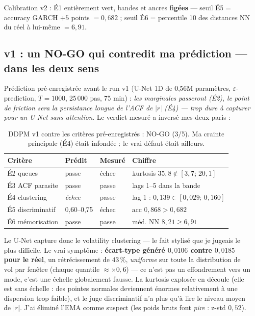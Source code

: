 \documentclass[11pt,a4paper]{article}
\newcommand{\ok}[1]{\textcolor{okgreen}{#1}}
\newcommand{\ko}[1]{\textcolor{kored}{#1}}
\begin{document}
Calibration v2 : É1 entièrement vert, bandes et ancres \textbf{figées} --- seuil É5 =
accuracy GARCH $+5$ points $= 0{,}682$ ; seuil É6 = percentile 10 des distances NN du
réel à lui-même $= 6{,}91$.

\subsection{v1 : un NO-GO qui contredit ma prédiction --- dans les deux sens}

Prédiction pré-enregistrée avant le run v1 (U-Net 1D de 0{,}56M paramètres,
$\varepsilon$-prediction, $T=1000$, 25\,000 pas, 75 min) : \emph{les marginales
passeront (É2), le point de friction sera la persistance longue de l'ACF de $|r|$
(É4) --- trop dure à capturer pour un U-Net sans attention.} Le verdict mesuré a
inversé mes deux paris :

\begin{table}[H]
\centering\small
\begin{tabular}{@{}llll@{}}
\toprule
\textbf{Critère} & \textbf{Prédit} & \textbf{Mesuré} & \textbf{Chiffre} \\
\midrule
É2 queues          & passe            & \ko{échec} & kurtosis $35{,}8 \notin [3{,}7;\,20{,}1]$ \\
É3 ACF parasite    & passe            & \ok{passe} & lags 1--5 dans la bande \\
É4 clustering      & \emph{échec}     & \ok{passe} & lag 1 : $0{,}139 \in [0{,}029;\,0{,}160]$ \\
É5 discriminatif   & 0{,}60--0{,}75   & \ko{échec} & acc $0{,}868 > 0{,}682$ \\
É6 mémorisation    & passe            & \ok{passe} & méd. NN $8{,}21 \geq 6{,}91$ \\
\bottomrule
\end{tabular}
\caption{DDPM v1 contre les critères pré-enregistrés : NO-GO (3/5). Ma crainte
principale (É4) était infondée ; le vrai défaut était ailleurs.}
\label{tab:ddpm_v1}
\end{table}

Le U-Net capture donc le volatility clustering --- le fait stylisé que je jugeais le
plus difficile. Le vrai symptôme : \textbf{écart-type généré $0{,}0106$ contre
$0{,}0185$ pour le réel}, un rétrécissement de $43\,\%$, \emph{uniforme} sur toute la
distribution de vol par fenêtre (chaque quantile $\approx \times 0{,}6$) --- ce n'est
pas un effondrement vers un mode, c'est une échelle globalement fausse. La kurtosis
explosée en découle (elle est sans échelle : des pointes normales deviennent énormes
relativement à une dispersion trop faible), et le juge discriminatif n'a plus qu'à
lire le niveau moyen de $|r|$. J'ai éliminé l'EMA comme suspect (les poids bruts font
\emph{pire} : z-std $0{,}52$).
\end{document}
